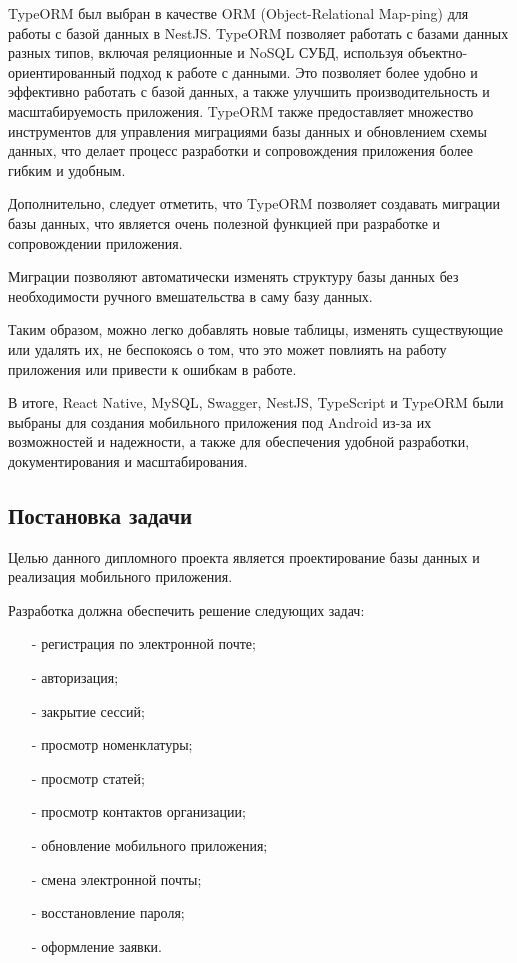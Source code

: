 TypeORM \cite{TypeORM} \cite{TypeOrmQueryRunner} был выбран в качестве ORM (Object-Relational Map-ping) для работы с базой данных в NestJS.
TypeORM позволяет работать с базами данных разных типов, включая реляционные и NoSQL СУБД, используя объектно-ориентированный подход к работе с данными.
Это позволяет более удобно и эффективно работать с базой данных, а также улучшить производительность и масштабируемость приложения.
TypeORM также предоставляет множество инструментов для управления миграциями базы данных и обновлением схемы данных, что делает процесс разработки и сопровождения приложения более гибким и удобным.

Дополнительно, следует отметить, что TypeORM позволяет создавать миграции базы данных,
что является очень полезной функцией при разработке и сопровождении приложения.

Миграции позволяют автоматически изменять структуру базы данных
без необходимости ручного вмешательства в саму базу данных.

Таким образом, можно легко добавлять новые таблицы,
изменять существующие или удалять их, не беспокоясь о том,
что это может повлиять на работу приложения или привести к ошибкам в работе.

В итоге, React Native, MySQL, Swagger, NestJS, TypeScript и TypeORM были выбраны для создания мобильного приложения под Android из-за их возможностей и надежности,
а также для обеспечения удобной разработки, документирования и масштабирования.

\newpage

\subsection{Постановка задачи}

Целью данного дипломного проекта является проектирование базы данных и реализация мобильного приложения.

Разработка должна обеспечить решение следующих задач:

\begin{itemize}
  \item[-] регистрация по электронной почте;
  \item[-] авторизация;
  \item[-] закрытие сессий;
  \item[-] просмотр номенклатуры;
  \item[-] просмотр статей;
  \item[-] просмотр контактов организации;
  \item[-] обновление мобильного приложения;
  \item[-] смена электронной почты;
  \item[-] восстановление пароля;
  \item[-] оформление заявки.
\end{itemize}


